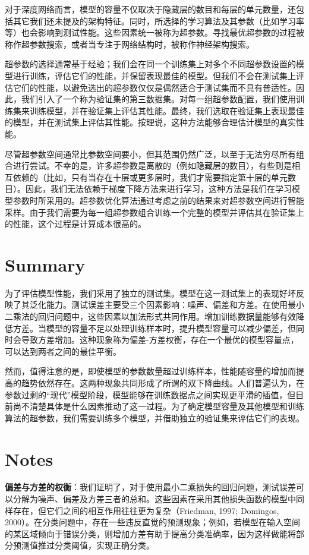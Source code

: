 对于深度网络而言，模型的容量不仅取决于隐藏层的数目和每层的单元数量，还包括其它我们还未提及的架构特征。同时，所选择的学习算法及其参数（比如学习率等）也会影响到测试性能。这些因素统一被称为超参数。寻找最优超参数的过程被称作超参数搜索，或者当专注于网络结构时，被称作神经架构搜索。

超参数的选择通常基于经验；我们会在同一个训练集上对多个不同超参数设置的模型进行训练，评估它们的性能，并保留表现最佳的模型。但我们不会在测试集上评估它们的性能，以避免选出的超参数仅仅是偶然适合于测试集而不具有普适性。因此，我们引入了一个称为验证集的第三数据集。对每一组超参数配置，我们使用训练集来训练模型，并在验证集上评估其性能。最终，我们选取在验证集上表现最佳的模型，并在测试集上评估其性能。按理说，这种方法能够合理估计模型的真实性能。

尽管超参数空间通常比参数空间要小，但其范围仍然广泛，以至于无法穷尽所有组合进行尝试。不幸的是，许多超参数是离散的（例如隐藏层的数目），有些则是相互依赖的（比如，只有当存在十层或更多层时，我们才需要指定第十层的单元数目）。因此，我们无法依赖于梯度下降方法来进行学习，这种方法是我们在学习模型参数时所采用的。超参数优化算法通过考虑之前的结果来对超参数空间进行智能采样。由于我们需要为每一组超参数组合训练一个完整的模型并评估其在验证集上的性能，这个过程是计算成本很高的。
\section{Summary}

为了评估模型性能，我们采用了独立的测试集。模型在这一测试集上的表现好坏反映了其泛化能力。测试误差主要受三个因素影响：噪声、偏差和方差。在使用最小二乘法的回归问题中，这些因素以加法形式共同作用。增加训练数据量能够有效降低方差。当模型的容量不足以处理训练样本时，提升模型容量可以减少偏差，但同时会导致方差增加。这种现象称为偏差-方差权衡，存在一个最优的模型容量点，可以达到两者之间的最佳平衡。

然而，值得注意的是，即使模型的参数数量超过训练样本，性能随容量的增加而提高的趋势依然存在。这两种现象共同形成了所谓的双下降曲线。人们普遍认为，在参数过剩的“现代”模型阶段，模型能够在训练数据点之间实现更平滑的插值，但目前尚不清楚具体是什么因素推动了这一过程。为了确定模型容量及其他模型和训练算法的超参数，我们需要训练多个模型，并借助独立的验证集来评估它们的表现。
\section{Notes}
\textbf{偏差与方差的权衡}：我们证明了，对于使用最小二乘损失的回归问题，测试误差可以分解为噪声、偏差及方差三者的总和。这些因素在采用其他损失函数的模型中同样存在，但它们之间的相互作用往往更为复杂（Friedman, 1997; Domingos, 2000）。在分类问题中，存在一些违反直觉的预测现象；例如，若模型在输入空间的某区域倾向于错误分类，则增加方差有助于提高分类准确率，因为这样做能将部分预测值推过分类阈值，实现正确分类。

